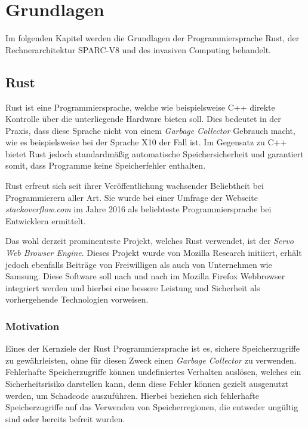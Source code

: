 \chapter{Grundlagen}\label{sec:basics}

Im folgenden Kapitel werden die Grundlagen der Programmiersprache Rust, der Rechnerarchitektur SPARC-V8 und
des invasiven Computing behandelt.

\section{Rust}

Rust ist eine Programmiersprache, welche wie beispielsweise C++ direkte Kontrolle über die
unterliegende Hardware bieten soll. Dies bedeutet in der Praxis, dass diese Sprache nicht von einem
\textit{Garbage Collector} Gebrauch macht, wie es beispielsweise bei der Sprache X10 der Fall ist.
Im Gegensatz zu C++ bietet Rust jedoch
standardmäßig automatische Speichersicherheit und garantiert somit, dass Programme keine Speicherfehler enthalten.
\cite{theRustLanguage}

Rust erfreut sich seit ihrer Veröffentlichung wachsender Beliebtheit bei Programmierern aller Art. Sie wurde
bei einer Umfrage der Webseite \textit{stackoverflow.com} im Jahre 2016 als beliebteste Programmiersprache bei 
Entwicklern ermittelt\cite{stackoverflowSurvey}.

Das wohl derzeit prominenteste Projekt, welches Rust verwendet, ist der \textit{Servo Web Browser Engine}.
Dieses Projekt wurde von Mozilla Research initiiert, erhält jedoch ebenfalls Beiträge von Freiwilligen
als auch von Unternehmen wie Samsung.
Diese Software soll nach und nach im Mozilla Firefox Webbrowser integriert werden und hierbei eine bessere
Leistung und Sicherheit als vorhergehende Technologien vorweisen\cite{engineeringServo}.

\subsection{Motivation}

Eines der Kernziele der Rust Programmiersprache ist es, sichere Speicherzugriffe zu gewährleisten, ohne
für diesen Zweck einen \textit{Garbage Collector} zu verwenden. Fehlerhafte Speicherzugriffe können undefiniertes
Verhalten auslösen, welches ein Sicherheitsrisiko darstellen kann, denn diese Fehler können gezielt ausgenutzt
werden, um Schadcode auszuführen. Hierbei beziehen sich fehlerhafte Speicherzugriffe auf das Verwenden von 
Speicherregionen, die entweder ungültig sind oder bereits befreit wurden.
\cite{engineeringServo}\cite{undefinedBehaviour}


